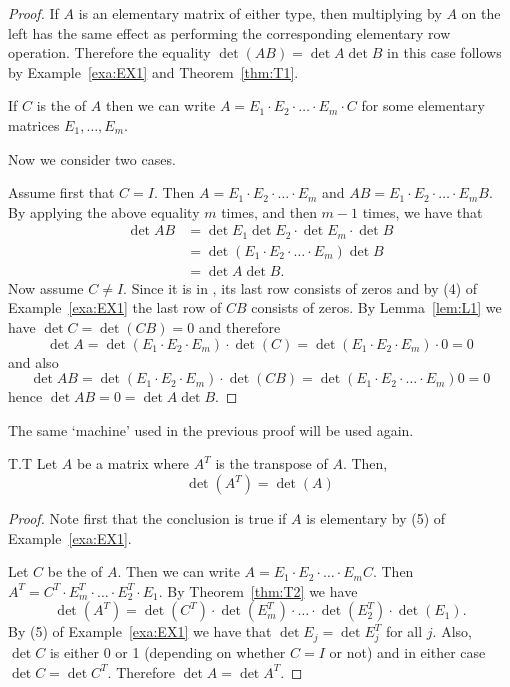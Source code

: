 \begin{proof}
  If $A$ is an elementary matrix of either type, then multiplying by
  $A$ on the left has the same effect as performing the corresponding
  elementary row operation. Therefore the equality
  $\det (AB) =\det A\det B$ in this case follows by
  Example~\ref{exa:EX1} and Theorem~\ref{thm:T1}.

  If $C$ is the {\rref} of $A$ then we can write
  $A=E_1\cdot E_2\cdot\dots\cdot E_m\cdot C$ for some elementary
  matrices $E_1,\dots, E_m$.

  Now we consider two cases.

  Assume first that $C=I$. Then $A=E_1\cdot E_2\cdot \dots\cdot E_m$
  and $AB= E_1\cdot E_2\cdot \dots\cdot E_m B$.  By applying the above
  equality $m$ times, and then $m-1$ times, we have that
  \begin{align*}
    \det AB&=\det E_1\det E_2\cdot \det E_m\cdot \det B\\
           &=\det (E_1\cdot E_2\cdot\dots\cdot E_m) \det B\\
           &=\det A\det B.
  \end{align*}
  Now assume $C\neq I$. Since it is in {\rref}, its last row consists
  of zeros and by (4) of Example~\ref{exa:EX1} the last row of $CB$
  consists of zeros.  By Lemma~\ref{lem:L1} we have
  $\det C=\det (CB)=0$ and therefore
  \begin{equation*}
    \det A=\det (E_1\cdot E_2\cdot  E_m)\cdot  \det (C)
    =
    \det (E_1\cdot E_2\cdot  E_m)\cdot 0=0
  \end{equation*}
  and also
  \begin{equation*}
    \det AB=\det (E_1\cdot E_2\cdot  E_m)\cdot  \det (C B)
    =\det (E_1\cdot E_2\cdot\dots\cdot E_m) 0
    =0
  \end{equation*}
  hence $\det AB=0=\det A \det B$.
\end{proof}

The same `machine' used in the previous proof will be used again.

\begin{theorem}{}{T.T}
  Let $A$ be a matrix where $A^T$ is the transpose of $A$. Then,
  \begin{equation*}
    \det(A^T) = \det (A)
  \end{equation*}
\end{theorem}

\begin{proof}
  Note first that the conclusion is true if $A$ is elementary by (5)
  of Example~\ref{exa:EX1}.

  Let $C$ be the {\rref} of $A$. Then we can write
  $A= E_1\cdot E_2\cdot \dots\cdot E_m C$.  Then
  $A^T=C^T\cdot E_m^T\cdot \dots \cdot E_2^T\cdot E_1$.  By
  Theorem~\ref{thm:T2} we have
  \begin{equation*}
    \det (A^T)=\det (C^T)\cdot \det (E_m^T)\cdot \dots \cdot \det (E_2^T)\cdot \det(E_1).
  \end{equation*}
  By (5) of Example~\ref{exa:EX1} we have that $\det E_j=\det E_j^T$
  for all $j$.  Also, $\det C$ is either 0 or 1 (depending on whether
  $C=I$ or not) and in either case $\det C=\det C^T$. Therefore
  $\det A=\det A^T$.
\end{proof}

